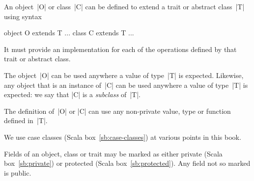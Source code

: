 
\begin{scalaBox}{\protect{}}
\label{sb:extends}
An object~|O| or class~|C| can be defined to extend a trait or abstract
class~|T| using syntax
\begin{scala}
  object O extends T{ ... }
  class C extends T{ ... }
\end{scala}
It must provide an implementation for each of the operations defined by that
trait or abstract class.

The object~|O| can be used anywhere a value of type~|T| is expected.
Likewise, any object that is an instance of~|C| can be used anywhere a value
of type~|T| is expected: we say that |C| is a \emph{subclass} of~|T|.

The definition of~|O| or |C| can use any non-private value, type or function
defined in~|T|.
\end{scalaBox}


\pagebreak[3]

We use case classes (Scala box~\ref{sb:case-classes}) at various points in
this book.

\pagebreak[3]

Fields of an object, class or trait may be marked as either private (Scala
box~\ref{sb:private}) or protected (Scala box~\ref{sb:protected}).  Any field
not so marked is public.

